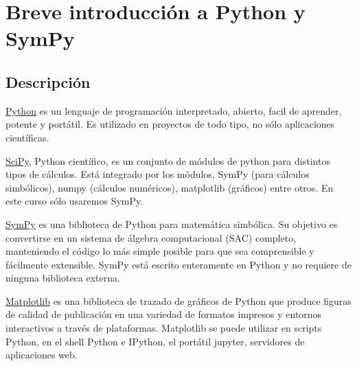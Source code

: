 \appendix


    

\chapter{Breve introducci\'on a Python y SymPy}
 


\section{Descripción}
\href{https://www.python.org/}{Python} es un lenguaje de programación interpretado, 
abierto, facil de aprender, potente y portátil. Es utilizado en proyectos de todo tipo, 
no sólo aplicaciones científicas.



\href{http://www.scipy.org/}{SciPy}, 
Python científico, es un conjunto de módulos de python para distintos tipos de cálculos. 
Está integrado por los módulos, SymPy (para cálculos simbólicos), 
numpy (cálculos numéricos), matplotlib (gráficos) entre otros.  
En este curso sólo usaremos SymPy.


\href{http://www.sympy.org/}{SymPy}
es una biblioteca de Python para matemática simbólica. Su objetivo es convertirse en 
un sistema de álgebra computacional (SAC) completo, manteniendo el código lo más simple 
posible para que sea comprensible y fácilmente extensible. SymPy está escrito enteramente 
en Python y no requiere de ninguna biblioteca externa.
% 
% 



\href{http://matplotlib.org/}{Matplotlib} es una biblioteca de trazado de gráficos de Python que produce figuras de calidad de publicación en una variedad de formatos impresos y entornos interactivos a través de plataformas. Matplotlib se puede utilizar en scripts Python, en el shell Python e IPython, el portátil jupyter, servidores de aplicaciones web.






